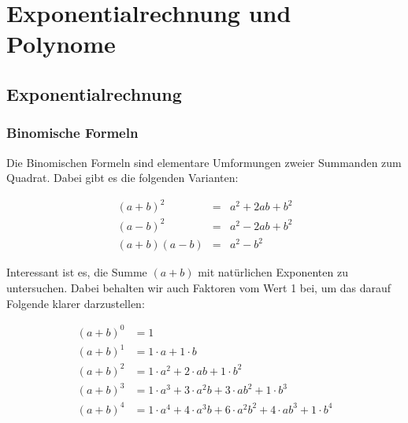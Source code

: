 

\chapter{Exponentialrechnung und Polynome}


\section{Exponentialrechnung}

\subsection{Binomische Formeln}

Die Binomischen Formeln sind elementare Umformungen zweier Summanden zum Quadrat. Dabei gibt es die folgenden Varianten:

\begin{eqnarray}
(a+b)^2 &=& a^2 +2ab +b^2 \label{eq:binom1} \\
(a-b)^2 &=& a^2 -2ab +b^2 \label{eq:binom2} \\
(a+b)(a-b) &=& a^2 -b^2 \label{eq:binom3}
\end{eqnarray}

Interessant ist es, die Summe $(a+b)$ mit natürlichen Exponenten zu untersuchen. Dabei behalten wir auch Faktoren vom Wert 1 bei, um das darauf Folgende klarer darzustellen:

\begin{equation} \label{eq:bino}
\begin{split}
(a+b)^0 &= 1 \\
(a+b)^1 &= 1\cdot a+1\cdot b \\
(a+b)^2 &= 1\cdot a^2 +2\cdot ab +1\cdot b^2 \\
(a+b)^3 &= 1\cdot a^3 + 3\cdot a^2b + 3\cdot ab^2 +1\cdot b^3 \\
(a+b)^4 &= 1\cdot a^4 + 4\cdot a^3b + 6\cdot a^2b^2 +4\cdot ab^3 + 1\cdot b^4
\end{split}
\end{equation}


